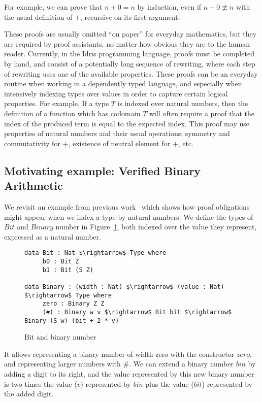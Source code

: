 For example, we can prove that $n+0 = n$ by induction, even if $n+0 \not\equiv
n$ with the usual definition of $+$, recursive on its first argument. 

These proofs are usually omitted ``on paper'' for everyday mathematics, but
they are required by proof assistants, no matter how obvious they are to the
human reader.
Currently, in the Idris programming language, proofs must be completed
by hand, and consist
of a potentially long sequence of rewriting, where each step of
rewriting uses one of the available properties. These proofs can be
an everyday
routine when working in a dependently typed language, and especially
when intensively indexing types over values in order to capture certain logical
properties.  For example, If a type $T$ is indexed over natural numbers, then
the definition of a function which has codomain $T$ will often require a
proof that the index of the produced term is equal to the expected index. This
proof may use properties of natural numbers and their usual operations:
symmetry and commutativity for +, existence of neutral element for +, etc.

\subsection{Motivating example: Verified Binary Arithmetic}
\label{sect:motivatingExample}

We revisit an example from previous work~\cite{bradytfp07} 
which shows how proof obligations might appear
when we index a type by natural numbers.  We define the types of
$Bit$ and $Binary$ number in Figure~\ref{binarynums}, 
both indexed over the value they represent, expressed as a natural number.

\begin{figure}[H]
\figrule
\begin{center}
\begin{lstlisting}
data Bit : Nat $\rightarrow$ Type where
     b0 : Bit Z
     b1 : Bit (S Z)
     
data Binary : (width : Nat) $\rightarrow$ (value : Nat) $\rightarrow$ Type where
     zero : Binary Z Z
     (#) : Binary w v $\rightarrow$ Bit bit $\rightarrow$ Binary (S w) (bit + 2 * v)
\end{lstlisting}
\end{center}
\caption{Bit and binary number}
\label{binarynums}
\figrule
\end{figure}

It allows representing a
binary number of width zero with the constructor $zero$, 
and representing larger numbers with $\#$.
We
can extend a binary number $bin$ by adding a digit to its right, and the value
represented by this new binary number is two times the value ($v$) represented
by $bin$ plus the value ($bit$) represented by the added digit.

